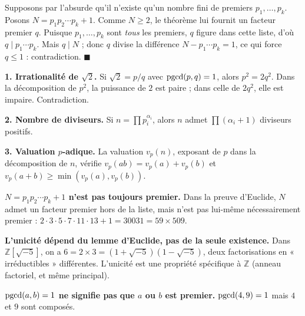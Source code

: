 
\begin{mdframed}[style=proofbar]
  Supposons par l'absurde qu'il n'existe qu'un nombre fini de premiers $p_1,\ldots,p_k$.
  Posons $N = p_1 p_2 \cdots p_k + 1$. Comme $N \geq 2$, le théorème lui fournit un
  facteur premier $q$. Puisque $p_1,\ldots,p_k$ sont \emph{tous} les premiers, $q$
  figure dans cette liste, d'où $q \mid p_1\cdots p_k$. Mais $q \mid N$ ; donc $q$
  divise la différence $N - p_1\cdots p_k = 1$, ce qui force $q \leq 1$ :
  contradiction.
  $\blacksquare$
\end{mdframed}

\decsep{}



\begin{mdframed}[style=exbar]
  \textbf{1. Irrationalité de $\sqrt{2}$.}\enspace%
  Si $\sqrt{2} = p/q$ avec $\operatorname{pgcd}(p,q)=1$, alors $p^2 = 2q^2$.
  Dans la décomposition de $p^2$, la puissance de $2$ est paire ;
  dans celle de $2q^2$, elle est impaire. Contradiction.

  \smallskip\noindent
  \textbf{2. Nombre de diviseurs.}\enspace%
  Si $n = \prod p_i^{\alpha_i}$, alors $n$ admet $\prod(\alpha_i+1)$ diviseurs positifs.

  \smallskip\noindent
  \textbf{3. Valuation $p$-adique.}\enspace%
  La valuation $v_p(n)$, exposant de $p$ dans la décomposition de $n$, vérifie
  $v_p(ab) = v_p(a)+v_p(b)$ et $v_p(a+b) \geq \min(v_p(a),v_p(b))$.
\end{mdframed}

\vspace{6pt}

\begin{mdframed}[style=cexbar]
  \textbf{$N = p_1 p_2 \cdots p_k + 1$ n'est pas toujours premier.}\enspace%
  Dans la preuve d'Euclide, $N$ admet un facteur premier hors de la liste,
  mais n'est pas lui-même nécessairement premier :
  $2 \cdot 3 \cdot 5 \cdot 7 \cdot 11 \cdot 13 + 1 = 30031 = 59 \times 509$.

  \smallskip\noindent
  \textbf{L'unicité dépend du lemme d'Euclide, pas de la seule existence.}\enspace%
  Dans $\mathbb{Z}[\sqrt{-5}]$, on a $6 = 2\times 3 = (1+\sqrt{-5})(1-\sqrt{-5})$,
  deux factorisations en « irréductibles » différentes. L'unicité est une propriété
  spécifique à $\mathbb{Z}$ (anneau factoriel, et même principal).

  \smallskip\noindent
  \textbf{$\operatorname{pgcd}(a,b)=1$ ne signifie pas que $a$ ou $b$ est premier.}\enspace%
  $\operatorname{pgcd}(4,9)=1$ mais $4$ et $9$ sont composés.
\end{mdframed}

